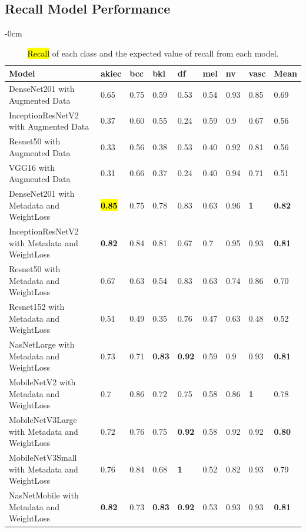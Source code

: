 \documentclass[sensors,article,accept,pdftex,moreauthors]{Definitions/mdpi}
\begin{document}
		
		\subsection[\appendixname~\thesection]{Recall Model Performance}
		\begin{table}[H]
\caption{\hl{Recall%
} of each class and the expected value of recall from each model.}
\label{appendix-table:recall-score-summary}

\begin{adjustwidth}{-\extralength}{0cm}
\centering
\begin{tabular}{p{9cm}  p{0.8cm}  p{0.8cm}  p{0.6cm}  p{0.6cm}  p{0.6cm}  p{0.6cm}  p{0.8cm}  p{0.9cm}} 
	\toprule
	\textbf{Model} & \textbf{akiec} & \textbf{bcc} & \textbf{bkl} & \textbf{df} & \textbf{mel} & \textbf{nv} & \textbf{vasc} & \textbf{Mean} \\
	\midrule
	DenseNet201 with Augmented Data & 0.65 & 0.75 & 0.59 & 0.53 & 0.54 & 0.93 & 0.85 & 0.69\\ 
	\midrule
	InceptionResNetV2 with Augmented Data & 0.37 & 0.60 & 0.55 & 0.24 & 0.59 & 0.9 & 0.67 & 0.56\\
	\midrule
	Resnet50 with Augmented Data & 0.33 & 0.56 & 0.38 & 0.53 & 0.40 & 0.92 & 0.81 & 0.56\\
	\midrule 	
	VGG16 with Augmented Data & 0.31 & 0.66 & 0.37 & 0.24 & 0.40 & 0.94 & 0.71 & 0.51\\ 
	\midrule		
	DenseNet201 with Metadata and WeightLoss & \textbf{\hl{0.85}} & 0.75 & 0.78 & 0.83 & 0.63 & 0.96 & \textbf{1} & \textbf{0.82}\\
	\midrule
	InceptionResNetV2 with Metadata and WeightLoss & \textbf{0.82} & 0.84 & 0.81 & 0.67 & 0.7 & 0.95 & 0.93 & \textbf{0.81}\\
	\midrule
	Resnet50 with Metadata and WeightLoss & 0.67 & 0.63 & 0.54 & 0.83 & 0.63 & 0.74 & 0.86 & 0.70\\
	\midrule
	Resnet152 with Metadata and WeightLoss & 0.51 & 0.49 & 0.35 & 0.76 & 0.47 & 0.63 & 0.48 & 0.52\\
	\midrule
	NasNetLarge with Metadata and WeightLoss & 0.73 & 0.71 & \textbf{0.83} & \textbf{0.92} & 0.59 & 0.9 & 0.93 & \textbf{0.81}\\
	\midrule
	MobileNetV2 with Metadata and WeightLoss & 0.7 & 0.86 & 0.72 & 0.75 & 0.58 & 0.86 & \textbf{1} & 0.78\\
	\midrule
	MobileNetV3Large with Metadata and WeightLoss & 0.72 & 0.76 & 0.75 & \textbf{0.92} & 0.58 & 0.92 & 0.92 & \textbf{0.80}\\
	\midrule
	MobileNetV3Small with Metadata and WeightLoss & 0.76 & 0.84 & 0.68 & \textbf{1} & 0.52 & 0.82 & 0.93 & 0.79\\
	\midrule
	NasNetMobile with Metadata and WeightLoss & \textbf{0.82} & 0.73 & \textbf{0.83} & \textbf{0.92} & 0.53 & 0.93 & 0.93 & \textbf{0.81}\\
	\bottomrule
\end{tabular}
\end{adjustwidth}
		\end{table}
		
\end{document}
